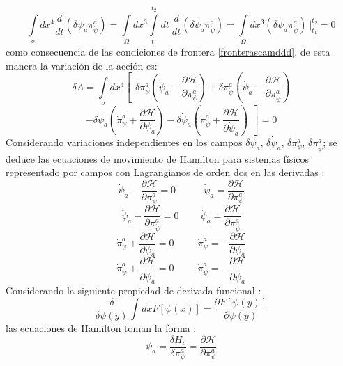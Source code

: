 \documentclass[a4paper,12pt]{article}
\begin{document}
$$\int\limits_{\sigma}dx^4\frac{d}{dt}(\delta\dot\psi_a\pi^{a}_{\dot\psi})=\int\limits_{\Omega}dx^3\int\limits_{t_1}^{t_2}dt\ \frac{d}{dt}(\delta\dot\psi_a\pi^{a}_{\dot\psi})=\int\limits_{\Omega}dx^3(\delta\dot\psi_a\pi^{a}_{\dot\psi})\ |_{t_1}^{t_2}=0$$ 
como consecuencia de las condiciones de frontera \eqref{fronterascamddd}, de esta manera la variación de la acción es:
\begin{equation}
\delta A=\int\limits_{\sigma}dx^4\left[\ \ \delta\pi^{a}_{\psi}\left(\dot\psi_a-\frac{\partial \mathscr{H}}{\partial\pi^{a}_{\psi}}\right)+\delta\pi^{a}_{\dot\psi}\left(\ddot\psi_a-\frac{\partial \mathscr{H}}{\partial\pi^{a}_{\dot\psi}}\right)\right. 
\end{equation}
$$\left.-\delta\psi_a\left(\dot\pi^{a}_{\psi}+\frac{\partial \mathscr{H}}{\partial\psi_a}\right)-\delta\dot\psi_a\left(\dot\pi^{a}_{\dot\psi}+\frac{\partial \mathscr{H}}{\partial\dot\psi_a}\right)\ \ \right]=0$$
Considerando variaciones independientes en los campos $\delta\psi_a$, $\delta\dot\psi_a$, $\delta\pi^{a}_{\psi}$, $\delta\pi^{a}_{\dot\psi}$; se deduce las ecuaciones de movimiento de Hamilton para sistemas físicos representado por campos con Lagrangianos de orden dos en las derivadas \cite{general,canoalor,tesis}:
\begin{equation}
\dot\psi_a-\frac{\partial \mathscr{H}}{\partial\pi^{a}_{\psi}}=0\ \ \ \ \ \ \ \ \ \ \ \ \ \dot\psi_a=\frac{\partial \mathscr{H}}{\partial\pi^{a}_{\psi}} 
\end{equation}
$$\ddot\psi_a-\frac{\partial \mathscr{H}}{\partial\pi^{a}_{\dot\psi}}=0\ \ \ \ \ \ \ \  \ \ \ddot\psi_a=\frac{\partial \mathscr{H}}{\partial\pi^{a}_{\dot\psi}}$$ 
$$\dot\pi^{a}_{\psi}+\frac{\partial \mathscr{H}}{\partial\psi_a}=0\ \ \ \ \ \ \ \ \ \ \ \dot\pi^{a}_{\psi}=-\frac{\partial \mathscr{H}}{\partial\psi_a}$$
$$\dot\pi^{a}_{\dot\psi}+\frac{\partial \mathscr{H}}{\partial\dot\psi_a}=0\ \ \ \ \ \ \ \ \ \ \ \dot\pi^{a}_{\dot\psi}=-\frac{\partial \mathscr{H}}{\partial\dot\psi_a}$$   
Considerando la siguiente propiedad de derivada funcional \cite{greiner}:
\begin{equation}
\frac{\delta}{\delta \psi(y)}\int\limits dx F[\psi(x)]=\frac{\partial F[\psi(y)]}{\partial  \psi(y)} 
\end{equation}
las ecuaciones de Hamilton toman la forma \cite{general,canoalor,tesis}:
\begin{equation}
\dot\psi_a=\frac{\delta H_c}{\delta \pi^{a}_{\psi}}=\frac{\partial \mathscr{H}}{\partial\pi^{a}_{\psi}}
\label{haecu} 
\end{equation}
\end{document}
